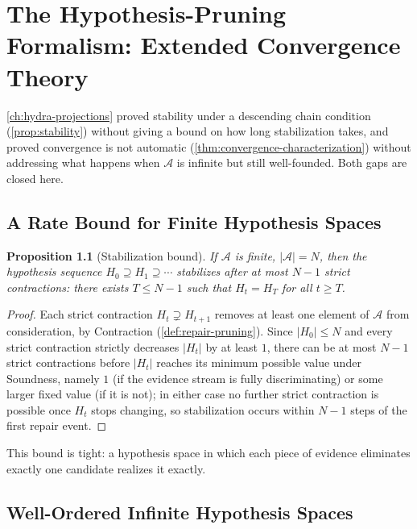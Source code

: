 \documentclass[11pt]{book}
\theoremstyle{plain}
\newtheorem{proposition}[theorem]{Proposition}
\theoremstyle{definition}
\theoremstyle{remark}
\begin{document}
\chapter{The Hypothesis-Pruning Formalism: Extended Convergence Theory}
\label{app:hypothesis-pruning-extended}

\cref{ch:hydra-projections} proved stability under a descending chain
condition (\cref{prop:stability}) without giving a bound on how long
stabilization takes, and proved convergence is not automatic
(\cref{thm:convergence-characterization}) without addressing what
happens when $\mathcal{A}$ is infinite but still well-founded. Both
gaps are closed here.

\section{A Rate Bound for Finite Hypothesis Spaces}

\begin{proposition}[Stabilization bound]
\label{app:prop-stabilization-bound}
If $\mathcal{A}$ is finite, $|\mathcal{A}| = N$, then the hypothesis
sequence $H_0 \supseteq H_1 \supseteq \cdots$ stabilizes after at most
$N - 1$ strict contractions: there exists $T \leq N - 1$ such that
$H_t = H_T$ for all $t \geq T$.
\end{proposition}

\begin{proof}
Each strict contraction $H_t \supsetneq H_{t+1}$ removes at least one
element of $\mathcal{A}$ from consideration, by Contraction
(\cref{def:repair-pruning}). Since $|H_0| \leq N$ and every strict
contraction strictly decreases $|H_t|$ by at least $1$, there can be
at most $N - 1$ strict contractions before $|H_t|$ reaches its
minimum possible value under Soundness, namely $1$ (if the evidence
stream is fully discriminating) or some larger fixed value (if it is
not); in either case no further strict contraction is possible once
$H_t$ stops changing, so stabilization occurs within $N-1$ steps of
the first repair event.
\end{proof}

This bound is tight: a hypothesis space in which each piece of
evidence eliminates exactly one candidate realizes it exactly.

\section{Well-Ordered Infinite Hypothesis Spaces}
\end{document}
